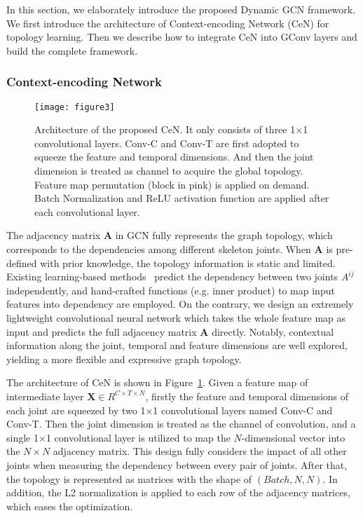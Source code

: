 \documentclass[sigconf]{acmart}
\begin{document}
In this section, we elaborately introduce the proposed Dynamic GCN framework. We first introduce the architecture of Context-encoding Network (CeN) for topology learning. Then we describe how to integrate CeN into GConv layers and build the complete framework.

\subsubsection{Context-encoding Network}

\begin{figure}[t]
\centering
\texttt{[image: figure3]} \caption{Architecture of the proposed CeN. It only consists of three 1$\times$1 convolutional layers. Conv-C and Conv-T are first adopted to squeeze the feature and temporal dimensions. And then the joint dimension is treated as channel to acquire the global topology. Feature map permutation (block in pink) is applied on demand. Batch Normalization and ReLU activation function are applied after each convolutional layer.}
\label{fig3}
\end{figure}

The adjacency matrix ${\mathbf{A}}$ in GCN fully represents the graph topology, which corresponds to the dependencies among different skeleton joints. When ${\mathbf{A}}$ is pre-defined with prior knowledge, the topology information is static and limited. Existing learning-based methods~\cite{zhang2019semantics,shi2019two,li2019spatio,liu2020} predict the dependency between two joints $A^{ij}$ independently, and hand-crafted functions (e.g. inner product) to map input features into dependency are employed. On the contrary, we design an extremely lightweight convolutional neural network which takes the whole feature map as input and predicts the full adjacency matrix $\mathbf{A}$ directly. Notably, contextual information along the joint, temporal and feature dimensions are well explored, yielding a more flexible and expressive graph topology.

The architecture of CeN is shown in Figure~\ref{fig3}. Given a feature map of intermediate layer ${\mathbf{X}} \in {R^{C \times T \times N}}$, firstly the feature and temporal dimensions of each joint are squeezed by two 1$\times$1 convolutional layers named Conv-C and Conv-T. Then the joint dimension is treated as the channel of convolution, and a single 1$\times$1 convolutional layer is utilized to map the $N$-dimensional vector into the $N\times N$ adjacency matrix. This design fully considers the impact of all other joints when measuring the dependency between every pair of joints. After that, the topology is represented as matrices with the shape of $\left( {Batch, N, N} \right)$. In addition, the L2 normalization is applied to each row of the adjacency matrices, which eases the optimization.
\end{document}
